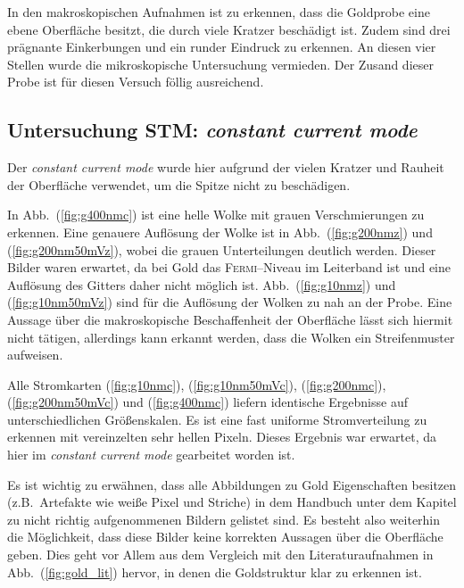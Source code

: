 \documentclass[sn-mathphys-num,iicol]{sn-jnl}
\theoremstyle{thmstyleone}
\theoremstyle{thmstyletwo}
\theoremstyle{thmstylethree}
\begin{document}
In den makroskopischen Aufnahmen ist zu erkennen, dass die Goldprobe eine ebene Oberfläche besitzt, die durch viele Kratzer beschädigt ist.
Zudem sind drei prägnante Einkerbungen und ein runder Eindruck zu erkennen.
An diesen vier Stellen wurde die mikroskopische Untersuchung vermieden. %
Der Zusand dieser Probe ist für diesen Versuch föllig ausreichend. %

\subsection{Untersuchung STM: \textit{constant current mode}}
Der \textit{constant current mode} wurde hier aufgrund der vielen Kratzer und Rauheit der Oberfläche verwendet, um die Spitze nicht zu beschädigen.

In Abb.\ (\ref{fig:g400nmc}) ist eine helle Wolke mit grauen Verschmierungen zu erkennen. 
Eine genauere Auflösung der Wolke ist in Abb.\ (\ref{fig:g200nmz}) und (\ref{fig:g200nm50mVz}), wobei die grauen Unterteilungen deutlich werden.
Dieser Bilder waren erwartet, da bei Gold das \textsc{Fermi}--Niveau im Leiterband ist und eine Auflösung des Gitters daher nicht möglich ist.
Abb.\ (\ref{fig:g10nmz}) und (\ref{fig:g10nm50mVz}) sind für die Auflösung der Wolken zu nah an der Probe.
Eine Aussage über die makroskopische Beschaffenheit der Oberfläche lässt sich hiermit nicht tätigen, allerdings kann erkannt werden, dass die Wolken ein Streifenmuster aufweisen.

Alle Stromkarten (\ref{fig:g10nmc}), (\ref{fig:g10nm50mVc}), (\ref{fig:g200nmc}), (\ref{fig:g200nm50mVc}) und (\ref{fig:g400nmc}) liefern identische Ergebnisse auf unterschiedlichen Größenskalen.
Es ist eine fast uniforme Stromverteilung zu erkennen mit vereinzelten sehr hellen Pixeln.
Dieses Ergebnis war erwartet, da hier im \textit{constant current mode} gearbeitet worden ist.

Es ist wichtig zu erwähnen, dass alle Abbildungen zu Gold Eigenschaften besitzen (z.B.\ Artefakte wie weiße Pixel und Striche) in dem Handbuch unter dem Kapitel zu nicht richtig aufgenommenen Bildern gelistet sind.
Es besteht also weiterhin die Möglichkeit, dass diese Bilder keine korrekten Aussagen über die Oberfläche geben.
Dies geht vor Allem aus dem Vergleich mit den Literaturaufnahmen in Abb.\ (\ref{fig:gold_lit}) hervor, in denen die Goldstruktur klar zu erkennen ist.
\end{document}

